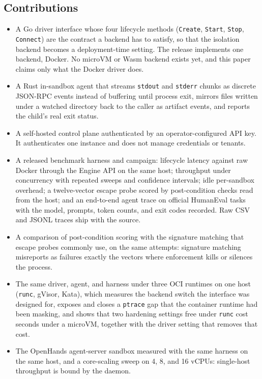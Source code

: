 \documentclass[conference]{IEEEtran}
\begin{document}
\subsection{Contributions}

\begin{itemize}
\item A Go driver interface whose four lifecycle methods
(\texttt{Create}, \texttt{Start}, \texttt{Stop}, \texttt{Connect}) are the
contract a backend has to satisfy, so that the isolation backend becomes a
deployment-time setting. The release implements one backend, Docker. No
microVM or Wasm backend exists yet, and this paper claims only what the
Docker driver does.
\item A Rust in-sandbox agent that streams \texttt{stdout} and \texttt{stderr}
chunks as discrete JSON-RPC events instead of buffering until process exit,
mirrors files written under a watched directory back to the caller as
artifact events, and reports the child's real exit status.
\item A self-hosted control plane authenticated by an operator-configured
API key. It authenticates one instance and does not manage credentials or
tenants.
\item A released benchmark harness and campaign: lifecycle latency against
raw Docker through the Engine API on the same host; throughput under
concurrency with repeated sweeps and confidence intervals; idle per-sandbox
overhead; a twelve-vector escape probe scored by post-condition checks read
from the host; and an end-to-end agent trace on official HumanEval tasks
with the model, prompts, token counts, and exit codes recorded. Raw CSV and
JSONL traces ship with the source.
\item A comparison of post-condition scoring with the signature matching
that escape probes commonly use, on the same attempts: signature matching
misreports as failures exactly the vectors where enforcement kills or
silences the process.
\item The same driver, agent, and harness under three OCI runtimes on one
host (\texttt{runc}, gVisor, Kata), which measures the backend switch the
interface was designed for, exposes and closes a \texttt{ptrace} gap that
the container runtime had been masking, and shows that two hardening
settings free under \texttt{runc} cost seconds under a microVM, together
with the driver setting that removes that cost.
\item The OpenHands agent-server sandbox measured with the same harness on
the same host, and a core-scaling sweep on 4, 8, and 16 vCPUs: single-host
throughput is bound by the daemon.
\end{itemize}
\end{document}
